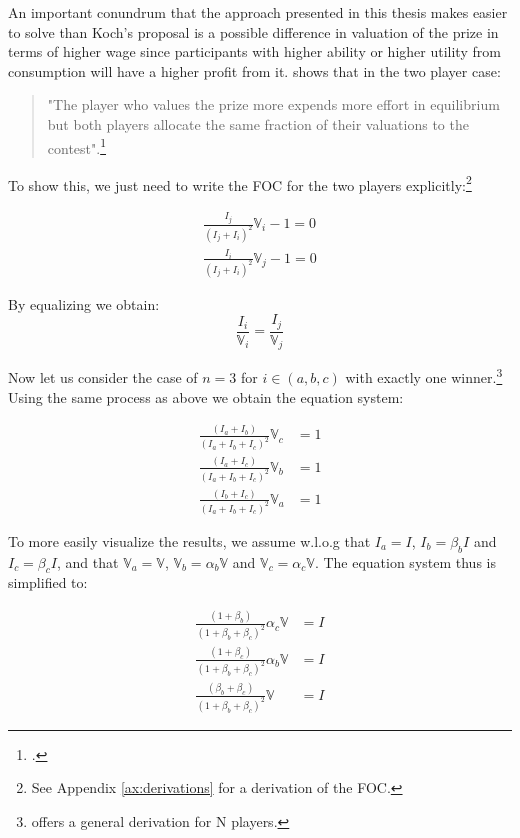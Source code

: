 \begin{appendices}
An important conundrum that the approach presented in this thesis makes easier to solve than Koch's proposal \cite{koch2017} is a possible difference in valuation of the prize in terms of higher wage since participants with higher ability or higher utility from consumption will have a higher profit from it. \cite{nti1999} shows that in the two player case:\\

\begin{quote}
    "The player who values the prize more expends more effort in equilibrium but both players allocate the same fraction of their valuations to the contest".\footnote{\cite[p.~419]{nti1999}.}
\end{quote}

To show this, we just need to write the FOC for the two players explicitly:\footnote{See Appendix \ref{ax:derivations} for a derivation of the FOC.}

\begin{equation*}
\begin{split}
    \frac{I_j}{(I_j + I_i)^2}\mathbb{V}_i-1 = 0 \\
    \frac{I_i}{(I_j + I_i)^2}\mathbb{V}_j-1 = 0
\end{split}
\end{equation*}

By equalizing we obtain:
\begin{equation}
    \frac{I_i}{\mathbb{V}_i} = \frac{I_j}{\mathbb{V}_j} 
\end{equation}

Now let us consider the case of $n=3$ for $i \in (a,b,c)$ with exactly one winner.\footnote{\cite{stein2002} offers a general derivation for N players.} Using the same process as above we obtain the equation system:

\begin{align}
    \frac{(I_a+I_b)}{(I_a+I_b+I_c)^2}\mathbb{V}_c&=1\\
    \frac{(I_a+I_c)}{(I_a+I_b+I_c)^2}\mathbb{V}_b&=1\\
    \frac{(I_b+I_c)}{(I_a+I_b+I_c)^2}\mathbb{V}_a&=1
\end{align}

To more easily visualize the results, we assume w.l.o.g that $I_a = I$, $I_b = \beta_b I$ and $ I_c = \beta_c I $, and that $\mathbb{V}_a = \mathbb{V}$, $\mathbb{V}_b = \alpha_b \mathbb{V} $ and $\mathbb{V}_c = \alpha_c \mathbb{V}$. The equation system thus is simplified to:

\begin{align}
    \label{eq:sys1}\frac{(1+\beta_b)}{(1+\beta_b+ \beta_c )^2}\alpha_c\mathbb{V}&=I\\
    \label{eq:sys2}\frac{(1+\beta_c )}{(1+\beta_b  + \beta_c )^2}\alpha_b\mathbb{V}&=I\\
    \label{eq:sys3}\frac{(\beta_b +\beta_c )}{(1+\beta_b  + \beta_c )^2}\mathbb{V}&=I
\end{align}


\end{appendices}
